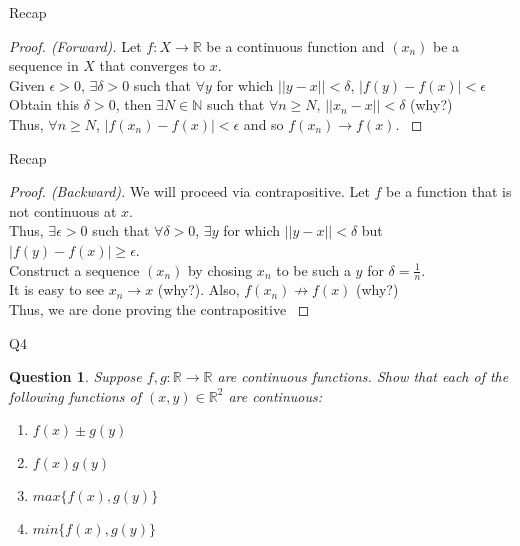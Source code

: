 \documentclass[handout,aspectratio=169]{beamer}
\newtheorem{qsn}{Question}
\newcommand{\bN}{\mathbb{N}}
\newcommand{\bR}{\mathbb{R}}
\newcommand{\norm}[1]{|#1|}
\newcommand{\normtwo}[1]{||#1||}
\begin{document}
\begin{frame}{Recap}
    \begin{proof}[Proof. (Forward)]
     {
    Let $f:X\to\bR$ be a continuous function and $(x_n)$ be a sequence in $X$ that converges to $x$.\\
    }
     {
    Given $\epsilon>0$, $\exists \delta>0$ such that $\forall y$ for which $\normtwo{y-x}<\delta$, $\norm{f(y)-f(x)}<\epsilon$\\
    }
     {
    Obtain this $\delta>0$, then $\exists N\in\bN$ such that $\forall n\geq N$, $\normtwo{x_n-x} < \delta$ (why?)\\
    }
     {
    Thus, $\forall n\geq N$, $\norm{f(x_n)-f(x)}<\epsilon$ and so $f(x_n)\to f(x)$.
    }
    \end{proof}
\end{frame}

\begin{frame}{Recap}
    \begin{proof}[Proof. (Backward)]
     {
    We will proceed via contrapositive. Let $f$ be a function that is not continuous at $x$.\\
    }
     {
    Thus, $\exists \epsilon>0$ such that $\forall \delta>0$, $\exists y$ for which $\normtwo{y-x}<\delta$ but $\norm{f(y)-f(x)}\geq \epsilon$.\\
    }
     {
    Construct a sequence $(x_n)$ by chosing $x_n$ to be such a $y$ for $\delta = \frac{1}{n}$.\\
    }
     {
    It is easy to see $x_n \to x$ (why?). Also, $f(x_n) \not\to f(x)$ (why?)\\
    }
     {
    Thus, we are done proving the contrapositive
    }
    \end{proof}
\end{frame}

\begin{frame}{Q4}
	\begin{qsn}
    Suppose $f, g : \mathbb{R} \to \mathbb{R}$ are continuous functions. Show that each of the following functions of
    $(x, y) \in \mathbb{R}^2$ are continuous:
    \begin{enumerate}
    	\item $f(x) \pm g(y)$
    	\item $f(x)g(y)$
    	\item $max\{f(x), g(y)\}$
    	\item $min\{f(x), g(y)\}$
    \end{enumerate}
    \end{qsn}
\end{frame}
\end{document}
